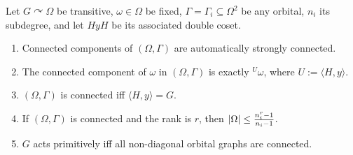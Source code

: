 \documentclass[fontsize=11pt,fleqn,a4paper]{scrartcl}
\begin{document}
\begin{corollary}
Let $G \curvearrowright \Omega$ be transitive, $\omega\in\Omega$ be fixed, $\Gamma=\Gamma_i\subseteq\Omega^2$ be any orbital, $n_i$ its subdegree, and let $HyH$ be its associated double coset.

\begin{enumerate}
\item Connected components of $(\Omega,\Gamma)$ are automatically strongly connected.
\item The connected component of $\omega$ in $(\Omega,\Gamma)$ is exactly ${^U\omega}$, where $U:=\langle H,y\rangle$.
\item $(\Omega,\Gamma)$ is connected iff $\langle H,y\rangle = G$.
\item If $(\Omega,\Gamma)$ is connected and the rank is $r$, then $\lvert\Omega\rvert \leq \frac{n_i^r-1}{n_i-1}$.
\item $G$ acts primitively iff all non-diagonal orbital graphs are connected.
\end{enumerate}
\end{corollary}
\end{document}
